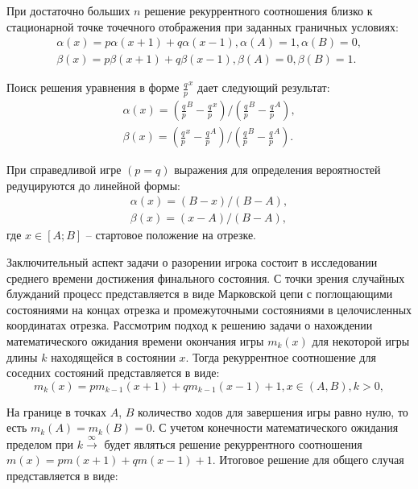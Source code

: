 При достаточно больших $n$ решение рекуррентного соотношения близко к стационарной точке точечного отображения при заданных граничных условиях:
\begin{equation}
    \label{eq:eq2}
    \begin{alignedat}{2}
        \alpha(x) = p\alpha(x+1)+q\alpha(x-1), \alpha(A)=1, \alpha(B)=0,\\
        \beta(x) = p\beta(x+1)+q\beta(x-1), \beta(A)=0, \beta(B)=1.
    \end{alignedat}
\end{equation}

Поиск решения уравнения в форме $\frac{q}{p}^{x}$ дает следующий результат:
\begin{equation}
    \label{eq:eq3}
    \begin{alignedat}{2}
        \alpha(x) = (\frac{q}{p}^B-\frac{q}{p}^x)/(\frac{q}{p}^B-\frac{q}{p}^A),\\
        \beta(x) = (\frac{q}{p}^x-\frac{q}{p}^A)/(\frac{q}{p}^B-\frac{q}{p}^A).
    \end{alignedat}
\end{equation}

При справедливой игре $(p=q)$ выражения для определения вероятностей редуцируются до линейной формы:
\begin{equation}
    \label{eq:eq4}
    \begin{alignedat}{2}
        \alpha(x) = (B-x)/(B-A),\\
        \beta(x) = (x-A)/(B-A),
    \end{alignedat}
\end{equation}
где $x \in [A; B]$ -- стартовое положение на отрезке.

Заключительный аспект задачи о разорении игрока состоит в исследовании среднего времени достижения финального состояния.
С точки зрения случайных блужданий процесс представляется в виде Марковской цепи с поглощающими состояниями на концах отрезка 
и промежуточными состояниями в целочисленных координатах отрезка. Рассмотрим подход к решению задачи о нахождении математического
ожидания времени окончания игры $m_k(x)$ для некоторой игры длины $k$ находящейся в состоянии $x$. Тогда рекуррентное соотношение 
для соседних состояний представляется в виде:
\begin{equation}
    \label{eq:eq5}
    m_k(x) = p m_{k-1}(x + 1) + q m_{k-1}(x - 1) + 1, x \in (A, B), k > 0,
\end{equation}

На границе в точках $A$, $B$ количество ходов для завершения игры равно нулю, то есть $m_k(A) = m_k(B) = 0$.
С учетом конечности математического ожидания пределом при $k \xrightarrow \infty$ будет являться решение рекуррентного соотношения 
$m(x)=p m(x+1) +q m(x - 1) + 1$. Итоговое решение для общего случая представляется в виде:

